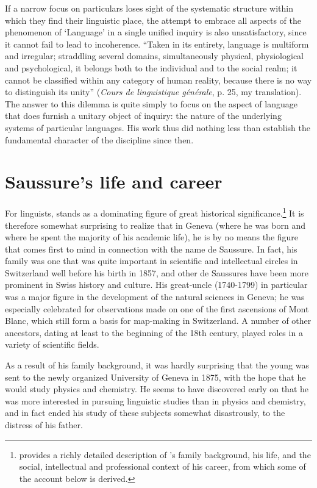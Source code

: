 If a narrow focus on particulars loses sight of the systematic
structure within which they find their linguistic place, the attempt
to embrace all aspects of the phenomenon of  `Language' in a single
unified inquiry is also unsatisfactory, since it cannot fail to lead
to incoherence.  ``Taken in its entirety, language is multiform and
irregular; straddling several domains, simultaneously physical,
physiological and psychological, it belongs both to the individual and
to the social realm; it cannot be classified within any category of
human reality, because there is no way to distinguish its unity''
(\textsl{Cours de linguistique générale}, p.  25, my translation).
The answer to this dilemma is quite simply to focus on the aspect of
language that does furnish a unitary object of inquiry: the nature of
the underlying systems of particular languages.  His work thus did
nothing less than establish the fundamental character of the
discipline since then.

\section{Saussure's life and career}


For linguists,  stands as a dominating figure of
great historical
significance.\footnote{\protect\citet{joseph12:saussure} provides a
  richly detailed description of 's family
  background, his life, and the social, intellectual and professional
  context of his career, from which some of the account below is
  derived.} It is therefore somewhat surprising to realize that in
Geneva (where he was born and where he spent the majority of his
academic life), he is by no means the figure that comes first to mind
in connection with the name de Saussure. In fact, his family was one
that was quite important in scientific and intellectual circles in
Switzerland well before his birth in 1857, and other de Saussures have
been more prominent in Swiss history and {culture}.  His great-uncle
 (1740-1799) in particular was a major
figure in the development of the natural sciences in Geneva; he was
especially celebrated for observations made on one of the first
ascensions of Mont Blanc, which still form a basis for map-making in
Switzerland.  A number of other ancestors, dating at least to the
beginning of the 18th century, played  roles in a variety
of scientific fields.

As a result of his family background, it was hardly surprising that
the young  was sent to the newly organized
University of Geneva in 1875, with the hope that he would study
physics and chemistry.  He seems to have discovered early on that he
was more interested in pursuing linguistic studies than in physics and
chemistry, and in fact ended his study of these subjects somewhat
disastrously, to the distress of his father.

